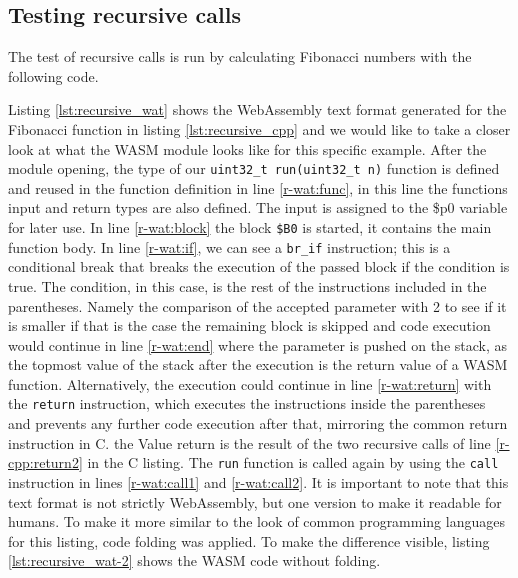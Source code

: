 \subsection{Testing recursive calls}
The test of recursive calls is run by calculating Fibonacci numbers with the following code.


Listing \ref{lst:recursive_wat} shows the WebAssembly text format generated for the Fibonacci function in listing \ref{lst:recursive_cpp} and we would like to take a closer look at what the WASM module looks like for this specific example. After the module opening, the type of our \lstinline{uint32_t run(uint32_t n)} function is defined and reused in the function definition in line \ref{r-wat:func}, in this line the functions input and return types are also defined. The input is assigned to the \$p0 variable for later use. In line \ref{r-wat:block} the block \lstinline{$B0} is started, it contains the main function body. In line \ref{r-wat:if}, we can see a \lstinline{br_if} instruction; this is a conditional break that breaks the execution of the passed block if the condition is true. The condition, in this case, is the rest of the instructions included in the parentheses. Namely the comparison of the accepted parameter with 2 to see if it is smaller if that is the case the remaining block is skipped and code execution would continue in line \ref{r-wat:end} where the parameter is pushed on the stack, as the topmost value of the stack after the execution is the return value of a WASM function. Alternatively, the execution could continue in line \ref{r-wat:return} with the \lstinline{return} instruction, which executes the instructions inside the parentheses and prevents any further code execution after that, mirroring the common return instruction in C. the Value return is the result of the two recursive calls of line \ref{r-cpp:return2} in the C listing. The \lstinline{run} function is called again by using the \lstinline{call} instruction in lines \ref{r-wat:call1} and \ref{r-wat:call2}.   
It is important to note that this text format is not strictly WebAssembly, but one version to make it readable for humans. To make it more similar to the look of common programming languages for this listing, code folding was applied. To make the difference visible, listing \ref{lst:recursive_wat-2} shows the WASM code without folding.


